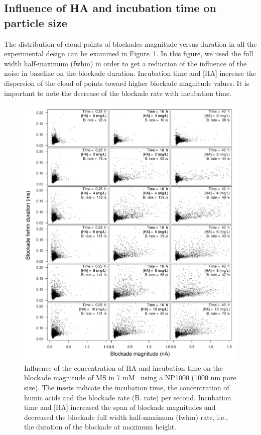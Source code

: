 \documentclass[journal=langd5,manuscript=article]{achemso}
\begin{document}







\subsection{Influence of HA and incubation time on particle size}

The  distribution of cloud points of blockades magnitude versus duration in all the experimental design can be examined in Figure~\ref{fgr:blockades}. In this figure, we used the full width half-maximum (fwhm) in order to get a reduction of the influence of the noise in baseline on the blockade duration. Incubation time and [HA]  increase the dispersion of the cloud of points toward higher blockade magnitude values. It is important to note the decrease of the blockade rate with incubation time.


 \begin{figure}
  \includegraphics[width=\linewidth]{Figures/Scattering_MS_HA_D2_detail.pdf}
  \caption{Influence of the concentration of HA and incubation time on the blockade magnitude of MS in 7 mM~ using a NP1000 (1000 nm pore size). The insets indicate the incubation time, the concentration of humic acids and the blockade rate (B. rate) per second. Incubation time and [HA] increased the span of blockade magnitudes and decreased the blockade full  width half-maximum (fwhm) rate, i.e., the duration of the blockade at maximum height.}
\label{fgr:blockades}
\end{figure}
\end{document}
